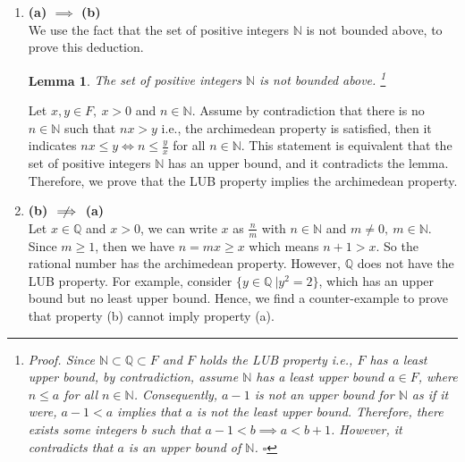 \documentclass[a4pap er]{article}
\newcommand{\N}{\mathbb{N}}
\newcommand{\Q}{\mathbb{Q}}
\theoremstyle{plain}
\newtheorem{lemma}{Lemma}
\begin{document}
\begin{enumerate}
\item \textbf{(a) $\implies$ (b)} \\
We use the fact that the set of positive integers $\N$
is not bounded above, to prove this deduction.
\begin{lemma} The set of positive integers $\N$ is not 
    bounded above.
    \footnote { \textit{Proof. }
    Since $\N \subset \Q \subset F$ and $F$ holds the LUB
    property i.e., $F$ has a least upper bound, 
    by contradiction, assume $\N$ has a least upper bound
    $a \in F$, where $n \leq a$ for all $n \in \N$.
    Consequently, $a-1$ is not an upper bound for $\N$
    as if it were, $a-1 < a$ implies that $a$ is not the
    \textit{least} upper bound. Therefore, there exists
    some integers $b$ such that $a-1 < b \implies a<b+1$.
    However, it contradicts that $a$ is an upper bound of
    $\N$. \hfill $\square$
}
\end{lemma}
Let $x, y \in F, \ x > 0$ and $n \in \N$. Assume by
contradiction that there is no $n \in \N$ such that 
$nx > y$ i.e., the archimedean property is satisfied, then
it indicates $nx \leq y \iff n \leq \frac{y}{x}$ for all 
$n \in \N$. This statement is equivalent that the set of 
positive integers $\N$ has an upper bound, and it 
contradicts the lemma. Therefore, we prove that the LUB
property implies the archimedean property.

\item \textbf{(b) $\centernot\implies$ (a)} \\
    Let $x \in \Q$ and $x > 0$, we can write $x$ as $\frac{n}{m}$ with $n \in \N$ and 
    $m \neq 0, \ m \in \N$. Since $m \geq 1$, then we have $n = mx \geq x$ which
    means $n+1 > x$. So the rational number has the archimedean property.
    However, $\Q$ does not have the LUB property. For example, consider
    $\{y \in \Q \  | y^2 = 2 \}$, which has an upper bound but no least upper bound.
    Hence, we find a counter-example to prove that property (b) cannot imply
    property (a).
\end{enumerate}
\end{document}
